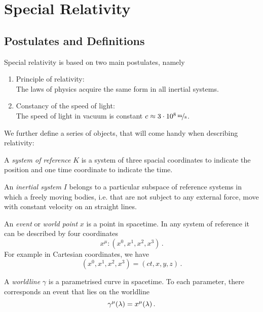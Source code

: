 \chapter{Special Relativity}
\section{Postulates and Definitions}
Special relativity is based on two main postulates, namely
\begin{enumerate}
    \item Principle of relativity: \\
    The laws of physics acquire the same form in all inertial systems.
    \item Constancy of the speed of light:\\
    The speed of light in vacuum is constant ${c\approx\unitfrac[3\cdot
    10^8]{m}{s}}$.
\end{enumerate}
We further define a series of objects, that will come handy when describing
relativity:
\begin{definition}
    A \emph{system of reference} $K$ is a system of three spacial coordinates
    to indicate the position and one time coordinate to indicate the time.
\end{definition}
\begin{definition}
    An \emph{inertial system} $I$ belongs to a particular subspace of reference
    systems in which a freely moving bodies, i.e. that are not subject to any external
    force, move with constant velocity on an straight lines.
\end{definition}
\begin{definition}[Event]
    An \emph{event} or \emph{world point} $x$ is a point in spacetime. In any
    system of reference it can be described by four coordinates
    \begin{equation}
        x^\mu: (x^0,x^1,x^2,x^3)\, .
    \end{equation}
    For example in Cartesian coordinates, we have
    \begin{equation}
        (x^0,x^1,x^2,x^3) = (ct,x,y,z)\, .
    \end{equation}
\end{definition}
\begin{definition}[Worldline]
    A \emph{worldline} $\gamma$ is a parametrised curve in spacetime. To each
    parameter, there corresponds an event that lies on the worldline
    \begin{equation}
        \tensor{\gamma}{^\mu}(\lambda)=\tensor{x}{^\mu}(\lambda)\, .
    \end{equation}
\end{definition}
